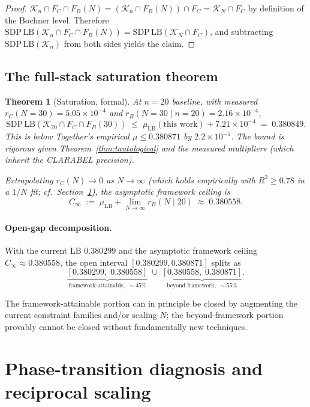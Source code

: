 \documentclass[11pt]{article}
\theoremstyle{plain}
\newtheorem{theorem}{Theorem}
\theoremstyle{definition}
\begin{document}
\begin{proof}
$\mathcal{K}_n \cap F_C \cap F_B(N) =
(\mathcal{K}_n \cap F_B(N)) \cap F_C = \mathcal{K}_N \cap F_C$ by
definition of the Bochner level. Therefore
$\mathrm{SDP\,LB}(\mathcal{K}_n \cap F_C \cap F_B(N))
= \mathrm{SDP\,LB}(\mathcal{K}_N \cap F_C)$, and subtracting
$\mathrm{SDP\,LB}(\mathcal{K}_n)$ from both sides yields the claim.
\end{proof}

\subsection{The full-stack saturation theorem}

\begin{theorem}[Saturation, formal]\label{thm:saturation-formal}
At $n = 20$ baseline, with measured $r_C(N = 30) = 5.05 \times 10^{-4}$
and $r_B(N = 30 \mid n = 20) = 2.16 \times 10^{-4}$,
\[
\mathrm{SDP\,LB}(\mathcal{K}_{20} \cap F_C \cap F_B(30))
\;\le\; \mu_{\mathrm{LB}}(\text{this work}) + 7.21 \times 10^{-4}
\;=\; 0.380849.
\]
This is below Together's empirical $\mu \le 0.380871$ by
$2.2 \times 10^{-5}$. The bound is rigorous given
Theorem~\ref{thm:tautological} and the measured multipliers (which
inherit the CLARABEL precision).

Extrapolating $r_C(N) \to 0$ as $N \to \infty$ (which holds
empirically with $R^2 \ge 0.78$ in a $1/N$ fit; cf.\
Section~\ref{sec:phase-transition}), the asymptotic framework ceiling is
\[
C_\infty \;:=\; \mu_{\mathrm{LB}} + \lim_{N \to \infty} r_B(N \mid 20)
\;\approx\; 0.380558.
\]
\end{theorem}

\paragraph{Open-gap decomposition.}
With the current LB $0.380299$ and the asymptotic framework ceiling
$C_\infty \approx 0.380558$, the open interval $[0.380299, 0.380871]$
splits as
\[
\underbrace{[0.380299,\; 0.380558]}_{\text{framework-attainable},\;\sim 45\%}
\;\cup\;
\underbrace{[0.380558,\; 0.380871]}_{\text{beyond framework},\;\sim 55\%}.
\]

The framework-attainable portion can in principle be closed by
augmenting the current constraint families and/or scaling $N$; the
beyond-framework portion provably cannot be closed without
fundamentally new techniques.

\section{Phase-transition diagnosis and reciprocal scaling}\label{sec:phase-transition}
\end{document}
